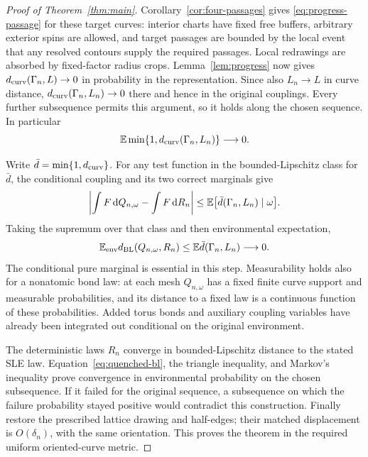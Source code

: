 \begin{proof}[Proof of Theorem~\ref{thm:main}]
Corollary~\ref{cor:four-passages} gives
\eqref{eq:progress-passage} for these target curves: interior
charts have fixed free buffers, arbitrary exterior spins are allowed,
and target passages are bounded by the local event that any resolved
contours supply the required passages.  Local redrawings are absorbed
by fixed-factor radius crops.  Lemma~\ref{lem:progress} now gives
$d_{\rm curv}(\Gamma_n,L)\to0$ in probability in the representation.
Since also $L_n\to L$ in curve distance,
$d_{\rm curv}(\Gamma_n,L_n)\to0$ there and hence in the original
couplings.  Every further subsequence permits this argument, so it
holds along the chosen sequence.  In particular
\begin{equation}
 \mathbb E\min\{1,d_{\rm curv}(\Gamma_n,L_n)\}\longrightarrow0.
 \label{eq:quenched-coupling-error}
\end{equation}

Write $\bar d=\min\{1,d_{\rm curv}\}$.  For any test function
in the bounded-Lipschitz class for $\bar d$, the conditional coupling
and its two correct marginals give
\[
 \left|\int F\,\mathrm d Q_{n,\omega}-\int F\,\mathrm d R_n\right|
 \le \mathbb E\bigl[\bar d(\Gamma_n,L_n)\mid\omega\bigr].
\]
Taking the supremum over that class and then environmental expectation,
\begin{equation}
 \mathbb E_{\rm env}d_{\rm BL}(Q_{n,\omega},R_n)
 \le \mathbb E\bar d(\Gamma_n,L_n)\longrightarrow0.
 \label{eq:quenched-bl}
\end{equation}
The conditional pure marginal is essential in this step.  Measurability
holds also for a nonatomic bond law: at each mesh $Q_{n,\omega}$ has
a fixed finite curve support and measurable probabilities, and its
distance to a fixed law is a continuous function of these probabilities.
Added torus bonds and auxiliary coupling variables have already been
integrated out conditional on the original environment.

The deterministic laws $R_n$ converge in bounded-Lipschitz distance
to the stated SLE law.  Equation~\eqref{eq:quenched-bl}, the triangle
inequality, and Markov's inequality prove convergence in environmental
probability on the chosen subsequence.  If it failed for the original
sequence, a subsequence on which the failure probability stayed
positive would contradict this construction.  Finally restore the
prescribed lattice drawing and half-edges; their matched displacement
is $O(\delta_n)$, with the same orientation.  This proves the theorem
in the required uniform oriented-curve metric.
\end{proof}
